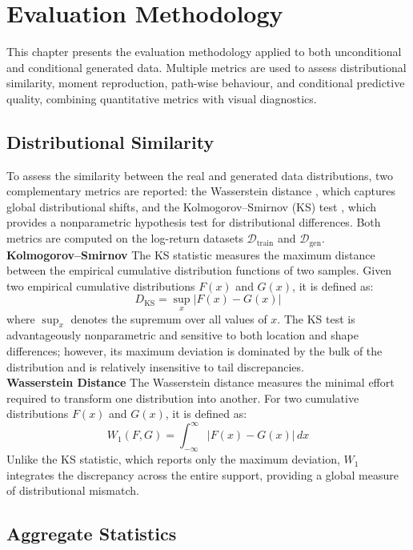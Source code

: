 \chapter{Evaluation Methodology}
\label{ch:evaluation_methodology}
This chapter presents the evaluation methodology applied to both unconditional and
conditional generated data. Multiple metrics are used to assess distributional similarity,
moment reproduction, path-wise behaviour, and conditional predictive quality, combining
quantitative metrics with visual diagnostics.

\section{Distributional Similarity}

To assess the similarity between the real and generated data distributions, two
complementary metrics are reported: the Wasserstein distance \cite{arjovsky2017wasserstein},
which captures global distributional shifts, and the Kolmogorov--Smirnov (KS) test
\cite{massey1951kolmogorov}, which provides a nonparametric hypothesis test for
distributional differences. Both metrics are computed on the log-return datasets
\(\mathcal{D}_{\text{train}}\) and \(\mathcal{D}_{\text{gen}}\).\\

\textbf{Kolmogorov--Smirnov} The KS statistic measures the maximum distance between
the empirical cumulative distribution functions of two samples. Given two empirical
cumulative distributions \(F(x)\) and \(G(x)\), it is defined as:
\[
    D_{\text{KS}} = \sup_x |F(x) - G(x)|
\]
where \(\sup_x\) denotes the supremum over all values of \(x\). The KS test is
advantageously nonparametric and sensitive to both location and shape differences;
however, its maximum deviation is dominated by the bulk of the distribution and is
relatively insensitive to tail discrepancies.\\

\textbf{Wasserstein Distance} The Wasserstein distance measures the minimal effort
required to transform one distribution into another. For two cumulative distributions
\(F(x)\) and \(G(x)\), it is defined as:
\[
    W_1(F, G) = \int_{-\infty}^{\infty} |F(x) - G(x)|\, dx
\]
Unlike the KS statistic, which reports only the maximum deviation, \(W_1\) integrates
the discrepancy across the entire support, providing a global measure of distributional
mismatch.

\section{Aggregate Statistics}


